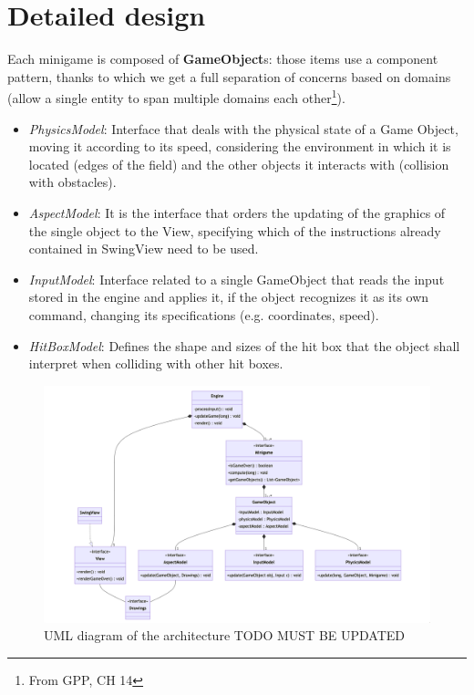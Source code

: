 \documentclass[a4paper,12pt]{report}
\begin{document}
\section{Detailed design}
Each minigame is composed of \textbf{GameObject}s: those items use a component pattern, thanks to which we get
a full separation of concerns based on domains (allow a single entity to span multiple domains each other\footnote{From GPP, CH 14}).
\pagebreak
\begin{itemize}
	\item \textit{PhysicsModel}: Interface that deals with the physical state of a Game Object,
	      moving it according to its speed, considering the environment in which it is located (edges of the field)
	      and the other objects it interacts with (collision with obstacles).
	\item \textit{AspectModel}: It is the interface that orders the updating of the graphics of the single
	      object to the View, specifying which of the instructions already contained in SwingView need to be used.
	\item \textit{InputModel}: Interface related to a single GameObject that reads the input stored in the
	      engine and applies it, if the object recognizes it as its own command, changing its specifications (e.g. coordinates, speed).
	\item \textit{HitBoxModel}: Defines the shape and sizes of the hit box that the object shall interpret when colliding with other hit boxes.
\end{itemize}

\begin{figure}[ht]
	\centering{}
	\includegraphics[width=\textwidth]{architecture.png}
	\caption{UML diagram of the architecture TODO MUST BE UPDATED}
\end{figure}
\end{document}
